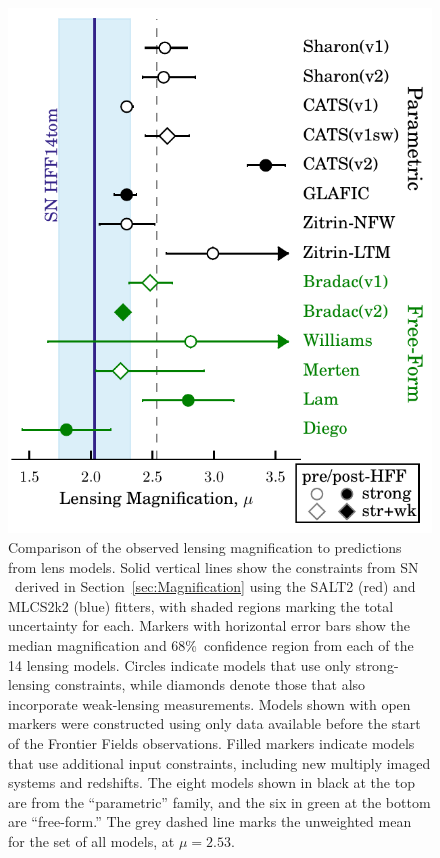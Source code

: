 \begin{figure}
\begin{center}
\includegraphics[width=\columnwidth]{FIG/snTomas_magnifications}
\caption{ 
Comparison of the observed lensing magnification to predictions from
lens models. Solid vertical lines show the constraints from SN \tomas\
derived in Section~\ref{sec:Magnification} using the SALT2 (red) and
MLCS2k2 (blue) fitters, with shaded regions marking the total
uncertainty for each. Markers with horizontal error bars show the
median magnification and 68\%\ confidence region from each of the 14
lensing models.  Circles indicate models that use only strong-lensing
constraints, while diamonds denote those that also incorporate
weak-lensing measurements.  Models shown with open markers were
constructed using only data available before the start of the Frontier
Fields observations.  Filled markers indicate models that use
additional input constraints, including new multiply imaged systems
and redshifts.  The eight models shown in black at the top are from
the ``parametric'' family, and the six in green at the bottom are
``free-form.''  The grey dashed line marks the unweighted mean for the
set of all models, at $\mu=2.53$.
\label{fig:lensingtest} }
\end{center}
\end{figure}

